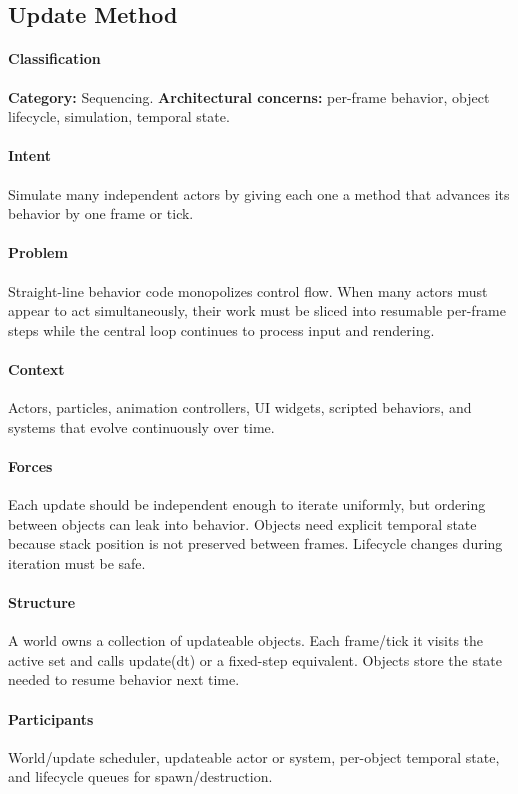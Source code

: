 \documentclass[11pt]{article}
\begin{document}
\subsection{Update Method}\label{pat:update-method}
\paragraph{Classification} \textbf{Category:} Sequencing. \textbf{Architectural concerns:} per-frame behavior, object lifecycle, simulation, temporal state.
\paragraph{Intent} Simulate many independent actors by giving each one a method that advances its behavior by one frame or tick.
\paragraph{Problem} Straight-line behavior code monopolizes control flow. When many actors must appear to act simultaneously, their work must be sliced into resumable per-frame steps while the central loop continues to process input and rendering.
\paragraph{Context} Actors, particles, animation controllers, UI widgets, scripted behaviors, and systems that evolve continuously over time.
\paragraph{Forces} Each update should be independent enough to iterate uniformly, but ordering between objects can leak into behavior. Objects need explicit temporal state because stack position is not preserved between frames. Lifecycle changes during iteration must be safe.
\paragraph{Structure} A world owns a collection of updateable objects. Each frame/tick it visits the active set and calls update(dt) or a fixed-step equivalent. Objects store the state needed to resume behavior next time.
\paragraph{Participants} World/update scheduler, updateable actor or system, per-object temporal state, and lifecycle queues for spawn/destruction.
\end{document}
